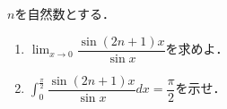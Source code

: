 \documentclass[../../main.tex]{subfiles}
\begin{document}
$n$を自然数とする．
\begin{enumerate}
  \item $\displaystyle \lim_{x \to 0} \dfrac{\sin (2n+1)x}{\sin x}$を求めよ．
  \item $\displaystyle \int_0^{\frac{\pi}{2}} \dfrac{\sin (2n+1)x}{\sin x}dx = \dfrac{\pi}{2}$を示せ．
\end{enumerate}
\end{document}
